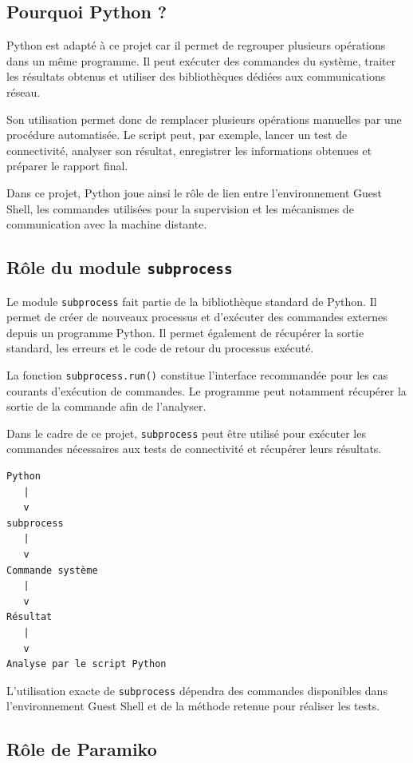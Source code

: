 \documentclass[12pt, a4paper, oneside]{report}
\begin{document}
\subsection*{Pourquoi Python ?}

Python est adapté à ce projet car il permet de regrouper plusieurs opérations dans un même programme. 
Il peut exécuter des commandes du système, traiter les résultats obtenus et utiliser des bibliothèques 
dédiées aux communications réseau.

Son utilisation permet donc de remplacer plusieurs opérations manuelles par une procédure automatisée. 
Le script peut, par exemple, lancer un test de connectivité, analyser son résultat, enregistrer les 
informations obtenues et préparer le rapport final.

Dans ce projet, Python joue ainsi le rôle de lien entre l'environnement Guest Shell, 
les commandes utilisées pour la supervision et les mécanismes de communication avec la machine distante.

\subsection*{Rôle du module \texttt{subprocess}}

Le module \texttt{subprocess} fait partie de la bibliothèque standard de Python. 
Il permet de créer de nouveaux processus et d'exécuter des commandes externes depuis 
un programme Python. Il permet également de récupérer la sortie standard, les erreurs 
et le code de retour du processus exécuté.

La fonction \texttt{subprocess.run()} constitue l'interface recommandée pour les cas courants d'exécution 
de commandes. Le programme peut notamment récupérer la sortie de la commande afin de l'analyser.

Dans le cadre de ce projet, \texttt{subprocess} peut être utilisé pour exécuter les commandes nécessaires 
aux tests de connectivité et récupérer leurs résultats.

\begin{verbatim}
Python
   |
   v
subprocess
   |
   v
Commande système
   |
   v
Résultat
   |
   v
Analyse par le script Python
\end{verbatim}

L'utilisation exacte de \texttt{subprocess} dépendra des commandes disponibles dans l'environnement Guest Shell et de la méthode retenue pour réaliser les tests.

\subsection*{Rôle de Paramiko}
\end{document}
